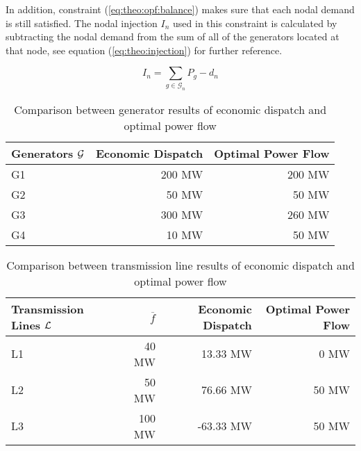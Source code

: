 In addition, constraint (\ref{eq:theo:opf:balance}) makes sure that each nodal demand is still satisfied. The nodal injection $I_n$ used in this constraint is calculated by subtracting the nodal demand from the sum of all of the generators located at that node, see equation (\ref{eq:theo:injection}) for further reference.

\begin{equation}
	I_n = \sum_{g\in\mathcal{G}_n} P_g - d_n
	\label{eq:theo:injection}
\end{equation}

\begin{table}[h!]
    \centering
    \begin{tabular}{lrr}
        Generators $\mathcal{G}$ & Economic Dispatch & Optimal Power Flow \\ \toprule
        G1 & 200 MW & 200 MW \\
        G2 & 50 MW & 50 MW \\
        G3 & 300 MW & 260 MW \\
        G4 & 10 MW & 50 MW \\
        \bottomrule
    \end{tabular}
    \caption{Comparison between generator results of economic dispatch and optimal power flow}
    \label{tab:theo:gen-comparison}
\end{table}

\begin{table}[h!]
    \centering
    \begin{tabular}{lrrr}
        Transmission Lines $\mathcal{L}$ & $\overline{f}$ & Economic Dispatch & Optimal Power Flow \\ \toprule
        L1 & 40 MW & 13.33 MW & 0 MW \\
        L2 & 50 MW & 76.66 MW & 50 MW \\
        L3 & 100 MW & -63.33 MW & 50 MW \\
        \bottomrule
    \end{tabular}
    \caption{Comparison between transmission line results of economic dispatch and optimal power flow}
    \label{tab:theo:line-comparison}
\end{table}

